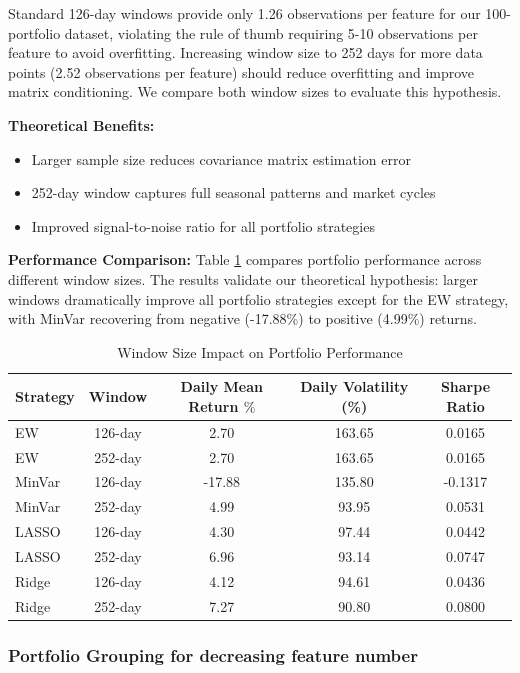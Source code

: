 \documentclass[12pt]{article}
\begin{document}
Standard 126-day windows provide only 1.26 observations per feature for our 100-portfolio dataset, violating the rule of thumb requiring 5-10 observations per feature to avoid overfitting. Increasing window size to 252 days for more data points (2.52 observations per feature) should reduce overfitting and improve matrix conditioning. We compare both window sizes to evaluate this hypothesis.

\textbf{Theoretical Benefits:}
\begin{itemize}
    \item Larger sample size reduces covariance matrix estimation error
    \item 252-day window captures full seasonal patterns and market cycles
    \item Improved signal-to-noise ratio for all portfolio strategies
\end{itemize}

\textbf{Performance Comparison:}
Table \ref{tab:window_comparison} compares portfolio performance across different window sizes. The results validate our theoretical hypothesis: larger windows dramatically improve all portfolio strategies except for the EW strategy, with MinVar recovering from negative (-17.88\%) to positive (4.99\%) returns.

\begin{table}[h]
\centering
\caption{Window Size Impact on Portfolio Performance}
\label{tab:window_comparison}
\begin{tabular}{lcccc}
\hline
Strategy & Window & Daily Mean Return \(\%\) & Daily Volatility (\%) & Sharpe Ratio \\
\hline
EW & 126-day & 2.70 & 163.65 & 0.0165 \\
EW & 252-day & 2.70 & 163.65 & 0.0165 \\
MinVar & 126-day & -17.88 & 135.80 & -0.1317 \\
MinVar & 252-day & 4.99 & 93.95 & 0.0531 \\
LASSO & 126-day & 4.30 & 97.44 & 0.0442 \\
LASSO & 252-day & 6.96 & 93.14 & 0.0747 \\
Ridge & 126-day & 4.12 & 94.61 & 0.0436 \\
Ridge & 252-day & 7.27 & 90.80 & 0.0800 \\
\hline
\end{tabular}
\end{table}

\subsubsection{Portfolio Grouping for decreasing feature number}
\end{document}
